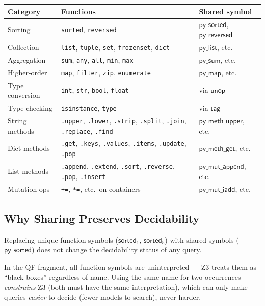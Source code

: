 \begin{center}
\small
\begin{tabular}{l l l}
  \textbf{Category} & \textbf{Functions} & \textbf{Shared symbol} \\
  \hline
  Sorting & \texttt{sorted}, \texttt{reversed} &
    $\mathsf{py\_sorted}$, $\mathsf{py\_reversed}$ \\
  Collection & \texttt{list}, \texttt{tuple}, \texttt{set},
    \texttt{frozenset}, \texttt{dict} &
    $\mathsf{py\_list}$, etc. \\
  Aggregation & \texttt{sum}, \texttt{any}, \texttt{all},
    \texttt{min}, \texttt{max} &
    $\mathsf{py\_sum}$, etc. \\
  Higher-order & \texttt{map}, \texttt{filter}, \texttt{zip},
    \texttt{enumerate} &
    $\mathsf{py\_map}$, etc. \\
  Type conversion & \texttt{int}, \texttt{str}, \texttt{bool},
    \texttt{float} &
    via $\mathsf{unop}$ \\
  Type checking & \texttt{isinstance}, \texttt{type} &
    via $\mathsf{tag}$ \\
  String methods & \texttt{.upper}, \texttt{.lower},
    \texttt{.strip}, \texttt{.split}, \texttt{.join},
    \texttt{.replace}, \texttt{.find} &
    $\mathsf{py\_meth\_upper}$, etc. \\
  Dict methods & \texttt{.get}, \texttt{.keys}, \texttt{.values},
    \texttt{.items}, \texttt{.update}, \texttt{.pop} &
    $\mathsf{py\_meth\_get}$, etc. \\
  List methods & \texttt{.append}, \texttt{.extend}, \texttt{.sort},
    \texttt{.reverse}, \texttt{.pop}, \texttt{.insert} &
    $\mathsf{py\_mut\_append}$, etc. \\
  Mutation ops & \texttt{+=}, \texttt{*=}, etc.\ on containers &
    $\mathsf{py\_mut\_iadd}$, etc. \\
\end{tabular}
\end{center}

\subsection{Why Sharing Preserves Decidability}

\begin{proposition}
Replacing unique function symbols ($\mathsf{sorted}_1$,
$\mathsf{sorted}_5$) with shared symbols ($\mathsf{py\_sorted}$)
does not change the decidability status of any query.

In the QF fragment, all function symbols are uninterpreted --- Z3
treats them as ``black boxes'' regardless of name.  Using the same
name for two occurrences \emph{constrains} Z3 (both must have the
same interpretation), which can only make queries \emph{easier} to
decide (fewer models to search), never harder.
\end{proposition}

